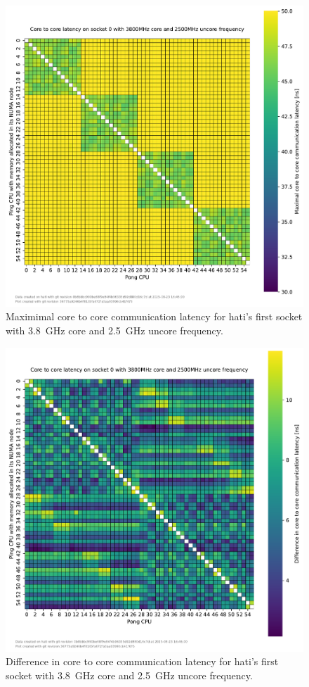 \begin{figure}[]
    \centering
    \includegraphics[width=\columnwidth]{fig/core-to-core-latency/core-to-core-heatmap-max-3800-2500.pdf}
    \caption{Maximimal core to core communication latency for hati's first socket with \SI{3.8}{\GHz} core and \SI{2.5}{\GHz} uncore frequency.}
\end{figure}
\begin{figure}[]
    \centering
    \includegraphics[width=\columnwidth]{fig/core-to-core-latency/core-to-core-heatmap-diff-3800-2500.pdf}
    \caption{Difference in core to core communication latency for hati's first socket with \SI{3.8}{\GHz} core and \SI{2.5}{\GHz} uncore frequency.}
\end{figure}

